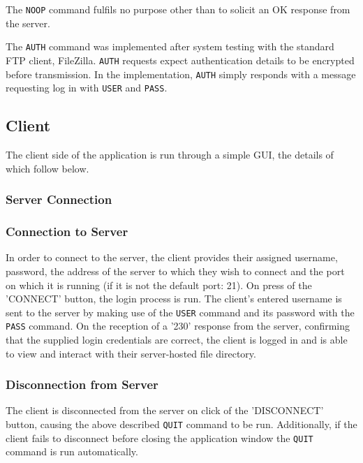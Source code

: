 \documentclass[10pt,twocolumn]{witseiepaper}
\begin{document}
The \texttt{NOOP} command fulfils no purpose other than to solicit an OK response from the server.

The \texttt{AUTH} command was implemented after system testing with the standard FTP client, FileZilla. \texttt{AUTH} requests expect authentication details to be encrypted before transmission. In the implementation, \texttt{AUTH} simply responds with a message requesting log in with \texttt{USER} and \texttt{PASS}.


\subsection{Client}



The client side of the application is run through a simple GUI, the details of which follow below.


\subsubsection{Server Connection}
\subsubsection*{Connection to Server}
In order to connect to the server, the client provides their assigned username, password, the address of the server to which they wish to connect and the port on which it is running (if it is not the default port: 21). On press of the 'CONNECT' button, the login process is run. The client's entered username is sent to the server by making use of the \texttt{USER} command and its password with the \texttt{PASS} command. On the reception of a '230' response from the server, confirming that the supplied login credentials are correct, the client is logged in and is able to view and interact with their server-hosted file directory.
 
\subsubsection*{Disconnection from Server} 
The client is disconnected from the server on click of the 'DISCONNECT' button, causing the above described \texttt{QUIT} command to be run. Additionally, if the client fails to disconnect before closing the application window the \texttt{QUIT} command is run automatically.
\end{document}
